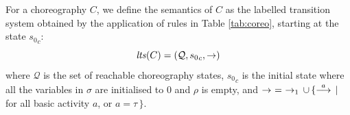 \begin{definition}

For a choreography $C$, we define the
semantics of $C$ as the labelled transition system
obtained by the application of rules in Table \ref{tab:coreo}, starting at the state ${s_0}_c$:
\[
  {\it lts}(C) = (\mathcal{Q}, {s_0}_c,  \rightarrow)
\]
%
\noindent
where $\mathcal{Q}$ is the set of reachable choreography states, ${s_0}_c$ is the initial state where all the variables in $\sigma$ are initialised to 0 and $\rho$ is empty, and
$\rightarrow \,\,= \,\,\rightarrow_1 \,\cup\, \{ \stackrel{a}{\longrightarrow}\,|\,$
for all basic activity $a$, or $a=\tau \,\}$.
\vspace{0.1cm}
\end{definition}

%




\vspace{-0.5cm}
